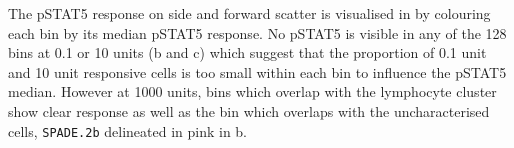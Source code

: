 The pSTAT5 response on side and forward scatter is visualised in  by colouring each bin by its median pSTAT5 response.
No pSTAT5 is visible in any of the 128 bins at 0.1 or 10 units (b and c) which suggest that the proportion of
0.1 unit and 10 unit responsive cells is too small within each bin to influence the pSTAT5 median.
However at 1000 units, bins which overlap with the lymphocyte cluster show clear response as well as the bin which overlaps with the uncharacterised cells, \texttt{SPADE.2b} delineated in pink in b.

%


